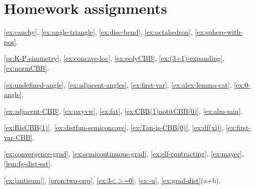 \chapter*{Homework assignments}

\ref{ex:cauchy},
\ref{ex:angle-triangle},
\ref{ex:disc-bend},
\ref{ex:octahedron},
\ref{ex:sphere-with-pos}.

\ref{pr:K-P-simmetry},
\ref{ex:concave-loc},
\ref{ex:polyCBB},
\ref{ex:(3+1)-expanding},
\ref{ex:normCBB}.

\ref{ex:undefined-angle},
\ref{ex:adjacent-angles},
\ref{ex:first-var},
\ref{ex:alex-lemma-cat},
\ref{ex:0-angle}.

\ref{ex:adjacent-CBB},
\ref{ex:pxyvw},
\ref{ex:fat},
\ref{ex:CBB(1)notitCBB(0)},
\ref{ex:alm-min}.

\ref{ex:RisCBB(1)},
\ref{ex:distfun-semiconcave},
\ref{ex:Tan-is-CBB(0)},
\ref{ex:df(xi)},
\ref{ex:first-var-CBB}.

\ref{ex:convergence-grad},
\ref{ex:semicontinuous-grad},
\ref{ex:elf-contracting},
\ref{ex:mayer},
\ref{lem:fg-dist-est}.

\ref{ex:|antisum|},
\ref{prop:two-opp},
\ref{ex:3<,>=0},
\ref{ex:-u},
\ref{ex:grad-dist}(a+b).

